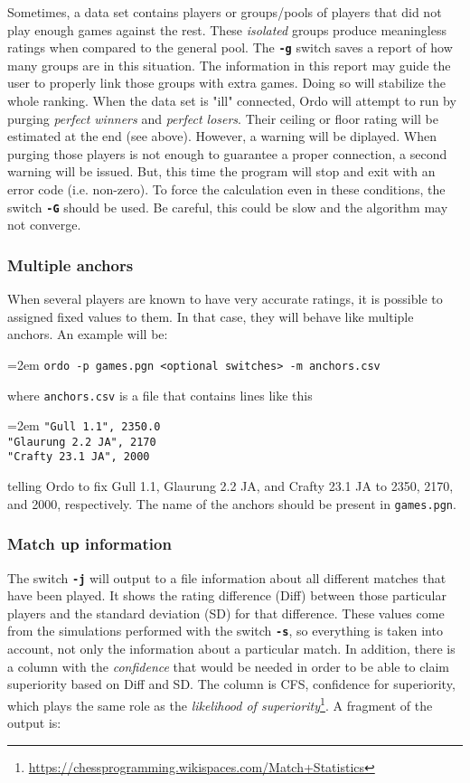 \documentclass[12pt]{article}
\newcommand{\swtch} [1] {\texttt{\textbf{#1}}}
\newcommand{\filename} [1] {\texttt{#1}}
\newcommand{\cmdln}[1]{
	\par
	\begingroup
		\leftskip=2em
		\addtolength{\rightskip}{0em}
		\noindent \small{\texttt{#1}}
		\par
	\endgroup
}
\begin{document}
Sometimes, a data set contains players or groups/pools of players that did not play enough games against the rest. 
These \textit{isolated} groups produce meaningless ratings when compared to the general pool. 
The \swtch{-g} switch saves a report of how many groups are in this situation.
The information in this report may guide the user to properly link those groups with extra games.
Doing so will stabilize the whole ranking.
When the data set is "ill" connected, Ordo will attempt to run by purging \textit{perfect winners} and \textit{perfect losers}.
Their ceiling or floor rating will be estimated at the end (see above). 
However, a warning will be diplayed.
When purging those players is not enough to guarantee a proper connection, a second warning will be issued.
But, this time the program will stop and exit with an error code (i.e. non-zero).
To force the calculation even in these conditions, the switch \swtch{-G} should be used.
Be careful, this could be slow and the algorithm may not converge.
 
\subsubsection*{Multiple anchors}

When several players are known to have very accurate ratings, it is possible to assigned fixed values to them.
In that case, they will behave like multiple anchors. An example will be:

\cmdln{ordo -p games.pgn <optional switches> -m anchors.csv}

where \filename{anchors.csv} is a file that contains lines like this

\cmdln{"Gull 1.1", 2350.0\\
"Glaurung 2.2 JA", 2170\\
"Crafty 23.1 JA", 2000}

telling Ordo to fix Gull 1.1, Glaurung 2.2 JA, and Crafty 23.1 JA to 2350, 2170, and 2000, respectively.
The name of the anchors should be present in \filename{games.pgn}.

\subsubsection*{Match up information}

The switch \swtch{-j} will output to a file information about all different matches that have been played.
It shows the rating difference (Diff) between those particular players and the standard deviation (SD) for that difference.
These values come from the simulations performed with the switch \swtch{-s}, so everything is taken into account, not only the information about a particular match.
In addition, there is a column with the \textit{confidence} that would be needed in order to be able to claim superiority based on Diff and SD. 
The column is CFS, confidence for superiority, which plays the same role as the \textit{likelihood of superiority}\footnote{\url{https://chessprogramming.wikispaces.com/Match+Statistics}}.
A fragment of the output is:
\end{document}
